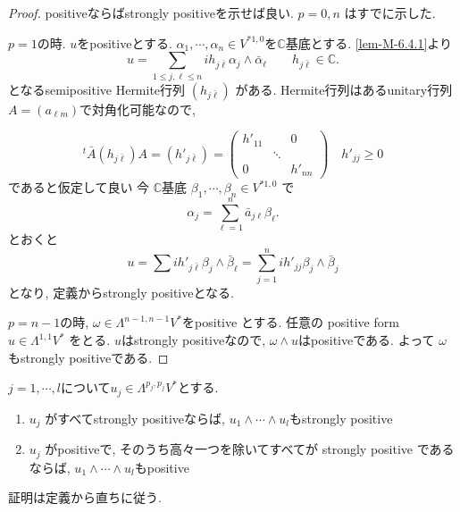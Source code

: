 \begin{proof}
positiveならばstrongly positiveを示せば良い. 
\(p=0,n\) はすでに示した. 

\(p=1\)の時. 
$u$をpositiveとする. 
\(
\alpha_1,\cdots,\alpha_n \in V^{*1,0}
\)を$\mathbb{C}$基底とする. 
\ref{lem-M-6.4.1}より
\[
u
=
\sum_{1\leq j,\ell\leq n}
i h_{j\bar{\ell}}\alpha_j\wedge \bar{\alpha}_{\ell}
\qquad
h_{j\bar{\ell}}\in \mathbb{C}.
\]
となるsemipositive Hermite行列 \((h_{j\bar{\ell}})\) がある.
Hermite行列はあるunitary行列$A=(a_{\ell m})$で対角化可能なので, 

\[
{}^t\bar{A}(h_{j\bar{\ell}})A
=
(h'_{j\bar{\ell}})
=
\begin{pmatrix}
h'_{11} &        & 0\\
         & \ddots &  \\
0        &        & h'_{nn}
\end{pmatrix}
\quad
h'_{jj}\geq 0
\]
であると仮定して良い
今 \(\mathbb{C}\)基底 \(\beta_1,\cdots,\beta_n\in V^{*1,0}\) で
\[
\alpha_j
=
\sum_{\ell=1}^n
\bar{a}_{j\ell}\beta_\ell .
\]
とおくと
\[
u
=
\sum i h'_{j\bar{\ell}}\beta_j\wedge \bar{\beta}_\ell
=
\sum_{j=1}^n i h'_{jj}\beta_j\wedge \bar{\beta}_j
\]
となり, 定義からstrongly positiveとなる.

\(p=n-1\)の時, 
\(
\omega \in \Lambda^{n-1,n-1}V^*
\)をpositive とする.  
任意の
positive form
\(
u\in \Lambda^{1,1}V^*
\)
をとる. $u$はstrongly positiveなので, 
\(
\omega \wedge u 
\)はpositiveである. 
よって
$\omega$もstrongly positiveである. 
\end{proof}


\begin{tcolorbox}[mybox]
\begin{lem}
\label{lem-M-6.4.3}
$j=1,\cdots,l$について\(
u_j \in \Lambda^{p_j,p_j}V^*
\)とする. 

\begin{enumerate}
\item  \(u_j\) がすべてstrongly positiveならば, 
\(u_1\wedge \cdots \wedge u_l\)もstrongly positive

\item \(u_j\) がpositiveで, そのうち高々一つを除いてすべてが strongly positive であるならば,
\(
u_1\wedge \cdots \wedge u_l
\)もpositive
\end{enumerate}
\end{lem}
\end{tcolorbox}
証明は定義から直ちに従う. 

